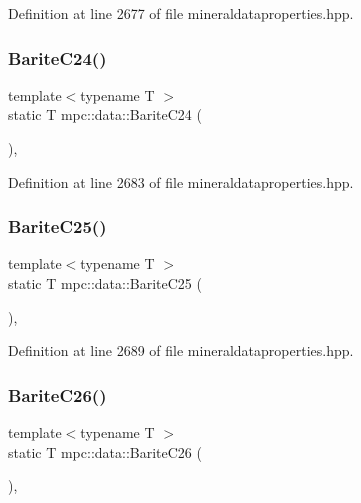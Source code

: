 Definition at line 2677 of file mineraldataproperties.\+hpp.

\mbox{\label{namespacempc_1_1data_a0b60f305e7b237157b9b103c3b9212fa}} 
\subsubsection{\texorpdfstring{Barite\+C24()}{BariteC24()}}
{\footnotesize\ttfamily template$<$typename T $>$ \\
static T mpc\+::data\+::\+Barite\+C24 (\begin{DoxyParamCaption}{ }\end{DoxyParamCaption})\hspace{0.3cm}{\ttfamily [inline]}, {\ttfamily [static]}}



Definition at line 2683 of file mineraldataproperties.\+hpp.

\mbox{\label{namespacempc_1_1data_aee2546f1d2113da1dc948dd7eaae43b8}} 
\subsubsection{\texorpdfstring{Barite\+C25()}{BariteC25()}}
{\footnotesize\ttfamily template$<$typename T $>$ \\
static T mpc\+::data\+::\+Barite\+C25 (\begin{DoxyParamCaption}{ }\end{DoxyParamCaption})\hspace{0.3cm}{\ttfamily [inline]}, {\ttfamily [static]}}



Definition at line 2689 of file mineraldataproperties.\+hpp.

\mbox{\label{namespacempc_1_1data_aed361ccefe29a4fec9f0456cab27552e}} 
\subsubsection{\texorpdfstring{Barite\+C26()}{BariteC26()}}
{\footnotesize\ttfamily template$<$typename T $>$ \\
static T mpc\+::data\+::\+Barite\+C26 (\begin{DoxyParamCaption}{ }\end{DoxyParamCaption})\hspace{0.3cm}{\ttfamily [inline]}, {\ttfamily [static]}}



